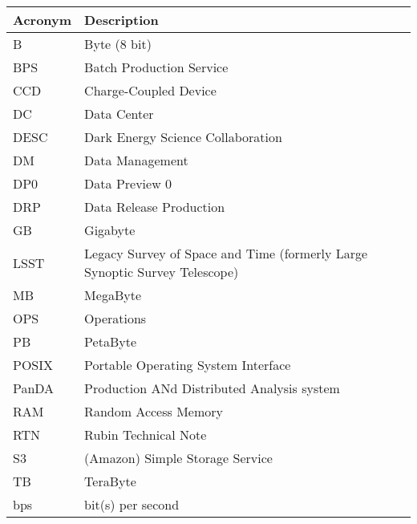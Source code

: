 \addtocounter{table}{-1}
\begin{longtable}{p{}p{}}\hline
\textbf{Acronym} & \textbf{Description}  \\\hline

B & Byte (8 bit) \\\hline
BPS & Batch Production Service \\\hline
CCD & Charge-Coupled Device \\\hline
DC & Data Center \\\hline
DESC & Dark Energy Science Collaboration \\\hline
DM & Data Management \\\hline
DP0 & Data Preview 0 \\\hline
DRP & Data Release Production \\\hline
GB & Gigabyte \\\hline
LSST & Legacy Survey of Space and Time (formerly Large Synoptic Survey Telescope) \\\hline
MB & MegaByte \\\hline
OPS & Operations \\\hline
PB & PetaByte \\\hline
POSIX & Portable Operating System Interface \\\hline
PanDA &  Production ANd Distributed Analysis system \\\hline
RAM & Random Access Memory \\\hline
RTN & Rubin Technical Note \\\hline
S3 & (Amazon) Simple Storage Service  \\\hline
TB & TeraByte \\\hline
bps & bit(s) per second \\\hline
\end{longtable}
